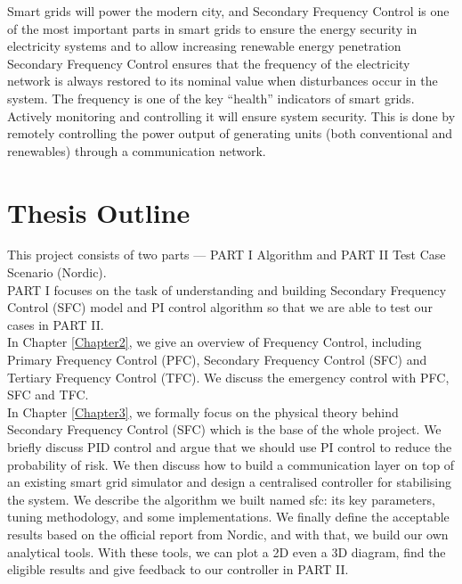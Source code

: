 \documentclass{report}
\begin{document}
Smart grids will power the modern city, and Secondary Frequency Control is one of the most important parts in smart grids to ensure the energy security in electricity systems and to allow increasing renewable energy penetration\\

Secondary Frequency Control ensures that the frequency of the electricity network is always restored to its nominal value when disturbances occur in the system. The frequency is one of the key “health” indicators of smart grids. Actively monitoring and controlling it will ensure system security. This is done by remotely controlling the power output of generating units (both conventional and renewables) through a communication network.\\


\section{Thesis Outline} %
This project consists of two parts — PART I Algorithm and PART II Test Case Scenario (Nordic).\\

PART I focuses on the task of understanding and building Secondary Frequency Control (SFC) model and PI control algorithm so that we are able to test our cases in PART II.\\


In Chapter \textcolor{red}{\ref{Chapter2}}, we give an overview of Frequency Control, including Primary Frequency Control (PFC), Secondary Frequency Control (SFC) and Tertiary Frequency Control (TFC). We discuss the emergency control with PFC, SFC and TFC.\\

In Chapter \textcolor{red}{\ref{Chapter3}}, we formally focus on the physical theory behind Secondary Frequency Control (SFC) which is the base of the whole project. We briefly discuss PID control and argue that we should use PI control to reduce the probability of risk. We then discuss how to build a communication layer on top of an existing smart grid simulator and design a centralised controller for stabilising the system. We describe the algorithm we built named sfc: its key parameters, tuning methodology, and some implementations. We finally define the acceptable results based on the official report from Nordic, and with that, we build our own analytical tools. With these tools, we can plot a 2D even a 3D diagram, find the eligible results and give feedback to our controller in PART II.\\
\end{document}
